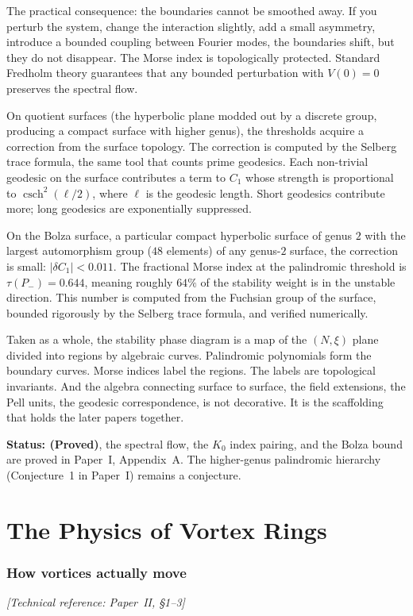 The practical consequence: the boundaries cannot be smoothed away. If
you perturb the system, change the interaction slightly, add a small
asymmetry, introduce a bounded coupling between Fourier modes, the
boundaries shift, but they do not disappear. The Morse index is
topologically protected. Standard Fredholm theory guarantees that any
bounded perturbation with $V(0) = 0$ preserves the spectral flow.

On quotient surfaces (the hyperbolic plane modded out by a discrete
group, producing a compact surface with higher genus), the thresholds
acquire a correction from the surface topology. The correction is
computed by the Selberg trace formula, the same tool that counts
prime geodesics. Each non-trivial geodesic on the surface contributes
a term to $C_1$ whose strength is proportional to
$\operatorname{csch}^2(\ell/2)$, where $\ell$ is the geodesic
length. Short geodesics contribute more; long geodesics are
exponentially suppressed.

On the Bolza surface, a particular compact hyperbolic surface of
genus $2$ with the largest automorphism group ($48$ elements) of any
genus-$2$ surface, the correction is small: $|\delta C_1| < 0.011$.
The fractional Morse index at the palindromic threshold is
$\tau(P_-) = 0.644$, meaning roughly $64\%$ of the stability weight
is in the unstable direction. This number is computed from the
Fuchsian group of the surface, bounded rigorously by the Selberg
trace formula, and verified numerically.

Taken as a whole, the stability phase diagram is a map of the
$(N, \xi)$ plane divided into regions by algebraic curves. Palindromic polynomials form the boundary curves. Morse indices label the regions.
The labels are topological invariants. And the algebra connecting
surface to surface, the field extensions, the Pell units, the
geodesic correspondence, is not decorative. It is the scaffolding
that holds the later papers together.

\textbf{Status: (Proved)}, the spectral flow, the $K_0$ index
pairing, and the Bolza bound are proved in Paper~I, Appendix~A.
The higher-genus palindromic hierarchy (Conjecture~1 in Paper~I)
remains a conjecture.


\part{The Physics of Vortex Rings}


\section{How vortices actually move}
\noindent\textit{[Technical reference: Paper~II, \S1--3]}

